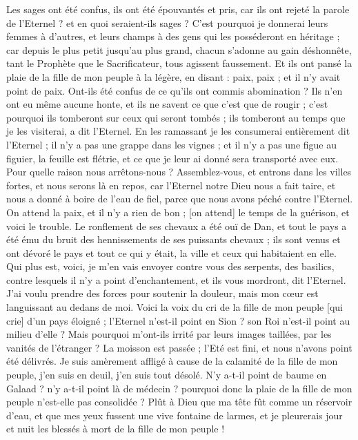 \begin{multicols}{2}
Les sages ont été confus, ils ont été épouvantés et pris, car ils ont rejeté la parole de l'Eternel ? et en quoi seraient-ils sages ?
C'est pourquoi je donnerai leurs femmes à d'autres, et leurs champs à des gens qui les posséderont en héritage ; car depuis le plus petit jusqu’au plus grand, chacun s'adonne au gain déshonnête, tant le Prophète que le Sacrificateur, tous agissent faussement.
Et ils ont pansé la plaie de la fille de mon peuple à la légère, en disant : paix, paix ; et il n'y avait point de paix.
Ont-ils été confus de ce qu'ils ont commis abomination ? Ils n'en ont eu même aucune honte, et ils ne savent ce que c'est que de rougir ; c'est pourquoi ils tomberont sur ceux qui seront tombés ; ils tomberont au temps que je les visiterai, a dit l'Eternel.
En les ramassant je les consumerai entièrement dit l'Eternel ; il n'y a pas une grappe dans les vignes ; et il n'y a pas une figue au figuier, la feuille est flétrie, et ce que je leur ai donné sera transporté avec eux.
Pour quelle raison nous arrêtons-nous ? Assemblez-vous, et entrons dans les villes fortes, et nous serons là en repos, car l'Eternel notre Dieu nous a fait taire, et nous a donné à boire de l'eau de fiel, parce que nous avons péché contre l'Eternel.
On attend la paix, et il n'y a rien de bon ; [on attend] le temps de la guérison, et voici le trouble.
Le ronflement de ses chevaux a été ouï de Dan, et tout le pays a été ému du bruit des hennissements de ses puissants chevaux ; ils sont venus et ont dévoré le pays et tout ce qui y était, la ville et ceux qui habitaient en elle.
Qui plus est, voici, je m'en vais envoyer contre vous des serpents, des basilics, contre lesquels il n'y a point d'enchantement, et ils vous mordront, dit l'Eternel.
J'ai voulu prendre des forces pour soutenir la douleur, mais mon cœur est languissant au dedans de moi.
Voici la voix du cri de la fille de mon peuple [qui crie] d'un pays éloigné ; l'Eternel n'est-il point en Sion ? son Roi n'est-il point au milieu d'elle ? Mais pourquoi m'ont-ils irrité par leurs images taillées, par les vanités de l'étranger ?
La moisson est passée ; l'Eté est fini, et nous n'avons point été délivrés.
Je suis amèrement affligé à cause de la calamité de la fille de mon peuple, j'en suis en deuil, j'en suis tout désolé.
N'y a-t-il point de baume en Galaad ? n'y a-t-il point là de médecin ? pourquoi donc la plaie de la fille de mon peuple n'est-elle pas consolidée ?
\VerseOne{}Plût à Dieu que ma tête fût comme un réservoir d'eau, et que mes yeux fussent une vive fontaine de larmes, et je pleurerais jour et nuit les blessés à mort de la fille de mon peuple !

\end{multicols}
